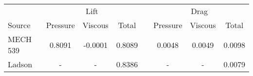 
\begin{tabular}{@{} l ccc c ccc}
\toprule
 & \multicolumn{3}{c}{Lift} & \phantom{a} & \multicolumn{3}{c}{Drag}\\
\cmidrule{2-4}\cmidrule{6-8}
Source & Pressure & Viscous & Total && Pressure & Viscous & Total\\
\midrule
MECH 539 & 0.8091 & -0.0001 & 0.8089 && 0.0048 & 0.0049 & 0.0098\\
Ladson & - & - & 0.8386 && - & - & 0.0079\\
\bottomrule
\end{tabular}
